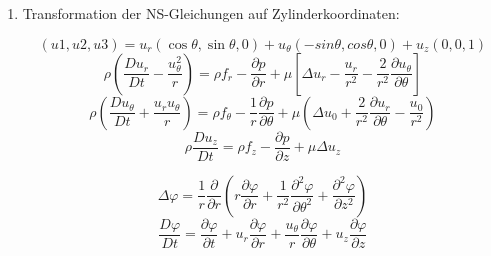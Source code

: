 \documentclass[a4paper,11pt]{scrartcl}
\begin{document}
\begin{enumerate}[label*=\textbf{6.\arabic*.}]
\begin{enumerate}[label=\textbf{\alph*)}]
  \end{enumerate}

  \item
    Transformation der NS-Gleichungen auf Zylinderkoordinaten:

    \[(u1, u2, u3) = u_r (\cos \theta, \sin \theta, 0)  + u_\theta (-sin \theta,
      cos \theta, 0) + u_z (0, 0, 1)\]
    \[ \rho \left(\frac{D u_r}{D t} - \frac{u_\theta^2}{r}\right) = \rho f_r - \frac{\partial
        p}{\partial r} + \mu \left[ \Delta u_r - \frac{u_r}{r^2} -
        \frac{2}{r^2}\frac{\partial u_\theta}{\partial \theta} \right]\]
    \[ \rho \left(\frac{D u_\theta}{D t} + \frac{u_r u_\theta}{r}\right) = \rho f_\theta -
      \frac{1}{r} \frac{\partial p}{\partial \theta} + \mu \left(\Delta u_0 +
      \frac{2}{r^2} \frac{\partial u_r}{\partial \theta} - \frac{u_0}{r^2}\right)\]
    \[\rho \frac{D u_z}{D t} = \rho f_z - \frac{\partial p}{\partial z} + \mu
      \Delta u_z\]

    \[\Delta \varphi = \frac{1}{r} \frac{\partial}{\partial r} \left(  r
        \frac{\partial\varphi}{\partial r} + \frac{1}{r^2} \frac{\partial^2
          \varphi}{\partial \theta^2} + \frac{\partial^2 \varphi}{\partial z^2} \right)\]
    \[ \frac{D\varphi}{D t} = \frac{\partial\varphi}{\partial t}+ u_r \frac{\partial
        \varphi}{\partial r} + \frac{u_\theta}{r} \frac{\partial \varphi}{\partial
        \theta} + u_z \frac{\partial \varphi}{\partial z}\]

\end{enumerate}
\end{document}
